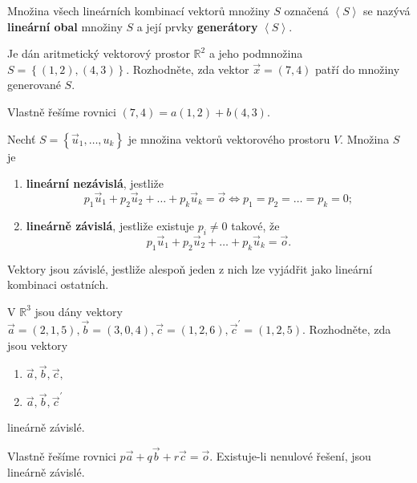 \begin{definition}
    Množina všech lineárních kombinací vektorů množiny $S$ označená $\left < S \right >$ se nazývá \textbf{lineární
    obal} množiny $S$ a její prvky \textbf{generátory} $\left < S \right >$.
\end{definition}

\begin{priklad}
Je dán aritmetický vektorový prostor $\mathbb R^{2}$ a jeho podmnožina $S=\left \{ (1,2), (4,3) \right \}. $
Rozhodněte, zda vektor $\vec x = (7,4)$ patří do množiny generované $S$.
\end{priklad}

\begin{reseni}
Vlastně řešíme rovnici $(7,4)=a(1,2)+b(4,3).$
\end{reseni}

\begin{definition}
    Nechť $S= \left \{ \vec u_1, \dots, u_k \right \} $ je množina vektorů vektorového prostoru $V$. Množina $S$ je
   	\begin{enumerate}[$i.$]
    \item \textbf{lineární nezávislá}, jestliže
    $$p_1\vec u_1 + p_2\vec u_2 + \dots + p_k\vec u_k = \vec o \iff p_1 = p_2 = \dots = p_k = 0;$$
   	\item \textbf{lineárně závislá}, jestliže existuje $p_i\ne 0$ takové, že
    $$ p_1\vec u_1 + p_2\vec u_2 + \dots + p_k\vec u_k = \vec o.$$
    \end{enumerate}
\end{definition}

\begin{veta}
    Vektory jsou závislé, jestliže alespoň jeden z nich lze vyjádřit jako lineární
    kombinaci ostatních.
\end{veta}

\begin{priklad}
V $\mathbb R^3$ jsou dány vektory $\vec a = (2,1,5), \vec b = (3,0,4), \vec c=(1,2,6),
\vec c^\prime = (1,2,5).$ Rozhodněte, zda jsou vektory
\begin{enumerate}[$a.$]
\item $\vec a, \vec b,\vec c,$
\item $\vec a, \vec b,\vec c^\prime$
\end{enumerate}
lineárně závislé.
\end{priklad}

\begin{reseni}
Vlastně řešíme rovnici $p\vec a + q\vec b + r\vec c= \vec o.$ Existuje-li nenulové
řešení, jsou lineárně závislé.
\end{reseni}

